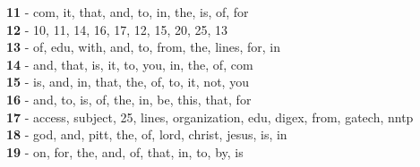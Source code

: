 \textbf{11} - com, it, that, and, to, in, the, is, of, for\\
\textbf{12} - 10, 11, 14, 16, 17, 12, 15, 20, 25, 13\\
\textbf{13} - of, edu, with, and, to, from, the, lines, for, in\\
\textbf{14} - and, that, is, it, to, you, in, the, of, com\\
\textbf{15} - is, and, in, that, the, of, to, it, not, you\\
\textbf{16} - and, to, is, of, the, in, be, this, that, for\\
\textbf{17} - access, subject, 25, lines, organization, edu, digex, from, gatech, nntp\\
\textbf{18} - god, and, pitt, the, of, lord, christ, jesus, is, in\\
\textbf{19} - on, for, the, and, of, that, in, to, by, is\\
